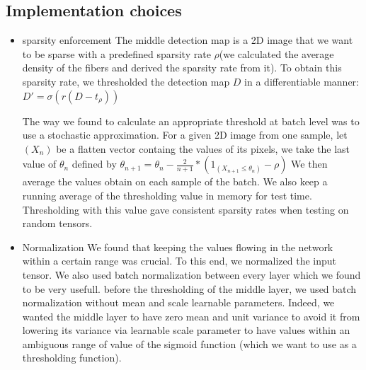 \documentclass{report}
\begin{document}
\subsection{Implementation choices}
\begin{itemize}
\item{sparsity enforcement}
\medskip
\newline
The middle detection map is a 2D image that we want to be sparse with a predefined sparsity rate $\rho$\quad(we calculated the average density of
the fibers and derived the sparsity rate from it).\newline
To obtain this sparsity rate, we thresholded the detection map $D$ in a differentiable manner: $D'=\sigma(r(D-t_{\rho}))$

The way we found to calculate an appropriate threshold at batch level was to use a stochastic approximation.\newline
For a given 2D image from one sample, let $(X_n)$ be a flatten vector containg the values of its pixels, we take the last value of $\theta_n$ defined by $\theta_{n+1}=\theta_n-\frac{2}{n+1}*(1_{(X_{n+1}\le\theta_n)}-\rho)$\newline
We then average the values obtain on each sample of the batch.\newline
We also keep a running average of the thresholding value in memory for test time.
Thresholding with this value gave consistent sparsity rates when testing on random tensors.
\medskip
\item{Normalization}
\medskip
\newline
We found that keeping the values flowing in the network within a certain range was crucial.
To this end, we normalized the input tensor. We also used batch normalization between every layer which we found to be very usefull.
before the thresholding of the middle layer, we used batch normalization without mean and scale learnable parameters.
Indeed, we wanted the middle layer to have zero mean and unit variance to avoid it from lowering its variance via learnable scale parameter to have values within an ambiguous range of value of the sigmoid function (which we want to use as a thresholding function).
\end{itemize}
\end{document}
